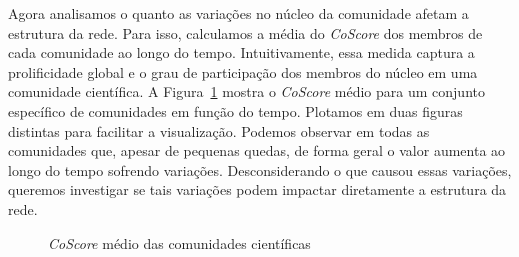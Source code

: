 \documentclass[12pt]{article}
\begin{document}
Agora analisamos o quanto as variações no núcleo da comunidade afetam a estrutura da rede. Para isso, calculamos 
a média do \textit{CoScore} dos membros de cada comunidade ao longo do tempo. Intuitivamente, essa medida captura a 
prolificidade global e o grau de participação dos membros do núcleo em uma comunidade científica. A Figura~\ref{fig:average_core_score} 
mostra o \textit{CoScore} médio para um conjunto específico de comunidades em função do tempo.
Plotamos em duas figuras distintas para facilitar a visualização. Podemos observar em todas as comunidades que, 
apesar de pequenas quedas, de forma geral o valor aumenta 
ao longo do tempo sofrendo variações. Desconsiderando o que 
causou essas variações, queremos investigar se tais variações podem impactar diretamente a estrutura da rede.

\begin{figure}[!htb]
  \begin{center}
  \end{center}
  \caption{\textit{CoScore} médio das comunidades científicas}
  \label{fig:average_core_score}
\end{figure}
\end{document}
